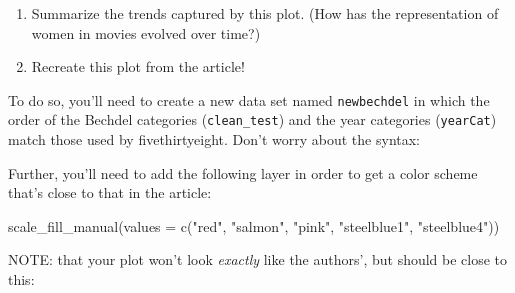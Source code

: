 \documentclass[
  letterpaper,
  DIV=11,
  numbers=noendperiod]{scrreprt}
\newenvironment{Shaded}{\begin{snugshade}}{\end{snugshade}}
\newcommand{\AttributeTok}[1]{\textcolor[rgb]{0.40,0.45,0.13}{#1}}
\newcommand{\DecValTok}[1]{\textcolor[rgb]{0.68,0.00,0.00}{#1}}
\newcommand{\FunctionTok}[1]{\textcolor[rgb]{0.28,0.35,0.67}{#1}}
\newcommand{\NormalTok}[1]{\textcolor[rgb]{0.00,0.23,0.31}{#1}}
\newcommand{\OtherTok}[1]{\textcolor[rgb]{0.00,0.23,0.31}{#1}}
\newcommand{\SpecialCharTok}[1]{\textcolor[rgb]{0.37,0.37,0.37}{#1}}
\newcommand{\StringTok}[1]{\textcolor[rgb]{0.13,0.47,0.30}{#1}}
\providecommand{\tightlist}{%
  \setlength{\itemsep}{0pt}\setlength{\parskip}{0pt}}\usepackage{longtable,booktabs,array}
\begin{document}
\begin{enumerate}
\def\labelenumi{\alph{enumi}.}
\tightlist
\item
  Summarize the trends captured by this plot. (How has the
  representation of women in movies evolved over time?)\\
\item
  Recreate this plot from the article!
\end{enumerate}

To do so, you'll need to create a new data set named \texttt{newbechdel}
in which the order of the Bechdel categories (\texttt{clean\_test}) and
the year categories (\texttt{yearCat}) match those used by
fivethirtyeight. Don't worry about the syntax:

\begin{Shaded}
\end{Shaded}

Further, you'll need to add the following layer in order to get a color
scheme that's close to that in the article:

\begin{Shaded}
\begin{Highlighting}[]
\FunctionTok{scale\_fill\_manual}\NormalTok{(}\AttributeTok{values =} \FunctionTok{c}\NormalTok{(}\StringTok{"red"}\NormalTok{, }\StringTok{"salmon"}\NormalTok{, }\StringTok{"pink"}\NormalTok{, }\StringTok{"steelblue1"}\NormalTok{, }\StringTok{"steelblue4"}\NormalTok{))}
\end{Highlighting}
\end{Shaded}

NOTE: that your plot won't look \emph{exactly} like the authors', but
should be close to this:
\end{document}
